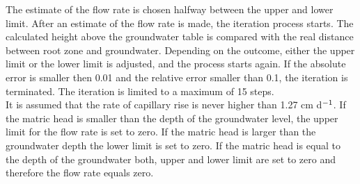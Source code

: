 \documentclass[11pt]{article}
\begin{document}
\bigskip
\bigskip
The estimate of the flow rate is chosen halfway between the upper and lower limit. After
an estimate of the flow rate is made, the iteration process starts. The calculated height
above the groundwater table is compared with the real distance between root zone and
groundwater. Depending on the outcome, either the upper limit or the lower limit is
adjusted, and the process starts again. If the absolute error is smaller then 0.01 and the
relative error smaller than 0.1, the iteration is terminated. The iteration is limited to a
maximum of 15 steps. \\
It is assumed that the rate of capillary rise is never higher than 1.27 cm d$^{{\rm -1}}$. If the matric
head is smaller than the depth of the groundwater level, the upper limit for the flow rate
is set to zero. If the matric head is larger than the groundwater depth the lower limit is
set to zero. If the matric head is equal to the depth of the groundwater both, upper and
lower limit are set to zero and therefore the flow rate equals zero.
\end{document}
